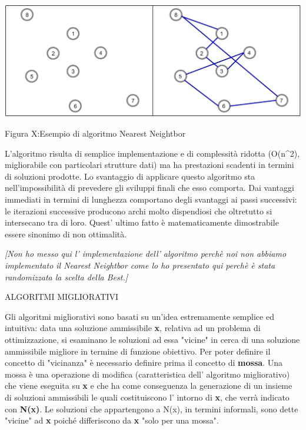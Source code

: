 \documentclass[11pt]{article}
\begin{document}
\begin{center}
\includegraphics[scale=0.5]{ng}  

Figura X:Esempio di algoritmo Nearest Neightbor
\end{center}

L'algoritmo risulta di semplice implementazione e di complessità ridotta (O(n^2), migliorabile con particolari strutture dati) ma ha prestazioni scadenti in termini di soluzioni prodotte. 
Lo svantaggio di applicare questo algoritmo sta nell'impossibilità di prevedere gli sviluppi finali che esso comporta. Dai vantaggi immediati in termini di lunghezza comportano degli svantaggi ai passi successivi: le iterazioni successive producono archi molto dispendiosi che oltretutto si intersecano tra di loro. Quest' ultimo fatto è matematicamente dimostrabile essere sinonimo di non ottimalità. 

\textit{[Non ho messo qui l' implementazione dell' algoritmo perchè noi non abbiamo implementato il Nearest Neightbor come lo ho presentato qui perchè è stata randomizzata la scelta della Best.]}

\vspace{2\baselineskip}
ALGORITMI MIGLIORATIVI
\vspace{2\baselineskip}

Gli algoritmi migliorativi sono basati su un'idea estremamente semplice ed intuitiva: data una soluzione ammissibile \textbf{x}, relativa ad un problema di ottimizzazione, si esaminano le soluzioni ad essa "vicine" in cerca di una soluzione ammissibile migliore in termine di funzione obiettivo. 
Per poter definire il concetto di "vicinanza" è necessario definire prima il concetto di \textbf{mossa}. Una mossa è una operazione di modifica (caratteristica dell' algoritmo migliorativo) che viene eseguita su \textbf{x} e che ha come conseguenza la generazione di un insieme di soluzioni ammissibili le quali costituiscono l' intorno di \textbf{x}, che verrà indicato con \textbf{N(x)}. Le soluzioni che appartengono a N(x), in termini informali, sono dette "vicine" ad \textbf{x} poiché differiscono da \textbf{x} "solo per una mossa". 
\end{document}
